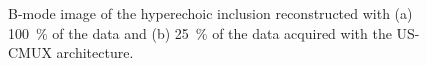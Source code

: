 \documentclass[9pt,conference]{IEEEtran}
\begin{document}
\begin{figure}[htb]
	\hfill%
	\hfill%
	\hfill%
	\caption{B-mode image of the hyperechoic inclusion reconstructed with (a) \SI{100}{\percent} of the data and (b) \SI{25}{\percent} of the data acquired with the US-CMUX architecture.}
	\label{fig:anechoic}
\end{figure}
\end{document}

